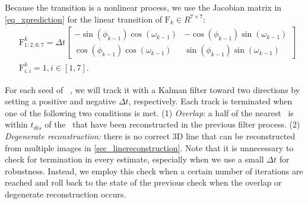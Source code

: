 Because the transition is a nonlinear process,
we use the Jacobian matrix in \cref{eq_xprediction} for the linear transition of $\mathrm F_k \in R^{7\times7}$:
\begin{equation}
    \begin{aligned}
        &\mathrm F^k_{1:2,6:7}=\Delta t\left[\begin{matrix}
             -\sin(\phi_{k-1}) \cos(\omega_{k-1}) & - \cos(\phi_{k-1}) \sin(\omega_{k-1})\\
             \cos(\phi_{k-1}) \cos(\omega_{k-1})  & \sin(\phi_{k-1}) \sin(\omega_{k-1})
        \end{matrix}\right]\\
        &\mathrm F^k_{i,i}=1,i \in [1,7].
    \end{aligned}
    \label {eq_jacobian}
\end{equation}

For each seed of \rlp~,
we will track it with a Kalman filter toward two directions by setting a positive and negative $\Delta t$,
respectively.
Each track is terminated when one of the following two conditions is met.
(1) \textit{Overlap}:
a half of the nearest \rlp~is within $t_{dis}$ of the \rlp~that have been reconstructed in the previous filter process.
(2) \textit{Degenerate reconstruction:}
there is no correct 3D line that can be reconstructed from multiple images in \cref{sec_linereconstruction}.
Note that
it is unnecessary to check for termination in every estimate, 
especially when we use a small $\Delta t$ for robustness.
Instead,
we employ this check when a certain number of iterations are reached and roll back to the state of the previous check when the overlap or degenerate reconstruction occurs. 

